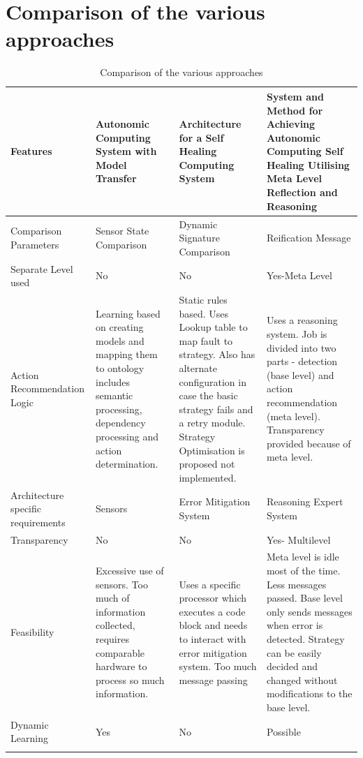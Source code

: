 \section{Comparison of the various approaches}
\begin{center}
\small		
\begin{longtable}{| p{3cm} | p{3.5cm} | p{3.5cm} | p{3.5cm} |}
\hline 
\bf{Features} & \bf{Autonomic Computing System with Model Transfer } & \bf{Architecture for a Self Healing Computing System} & \bf{System and Method for Achieving Autonomic Computing Self Healing Utilising Meta Level Reflection and Reasoning}\\ \hline
{Comparison Parameters} & {Sensor State Comparison} & {Dynamic Signature Comparison} & {Reification Message} \\ \hline
{Separate Level used} & {No} & {No} & {Yes-Meta Level}\\ \hline
{Action Recommendation Logic} & {Learning based on creating models and mapping them to ontology includes semantic processing, dependency processing and action determination. } & {Static rules based. Uses Lookup table to map fault to strategy. Also has alternate configuration in case the basic strategy fails and a retry module. Strategy Optimisation is proposed not implemented.} & {Uses a reasoning system. Job is divided into two parts - detection (base level) and action recommendation (meta level). Transparency provided because of meta level.}\\ \hline
{Architecture specific requirements} & {Sensors} & {Error Mitigation System} & {Reasoning Expert System}\\ \hline
{Transparency} & {No} & {No} & {Yes- Multilevel}\\ \hline
{Feasibility} & {Excessive use of sensors. Too much of information collected, requires comparable hardware to process so much information.} & {Uses a specific processor which executes a code block and needs to interact with error mitigation system. Too much message passing} & {Meta level is idle most of the time. Less messages passed. Base level only sends messages when error is detected. Strategy can be easily decided and changed without modifications to the base level.}\\ \hline
{Dynamic Learning} & {Yes} & {No} & {Possible}\\ \hline
\caption{Comparison of the various approaches}
\end{longtable}
\label{table1}
\end{center}
